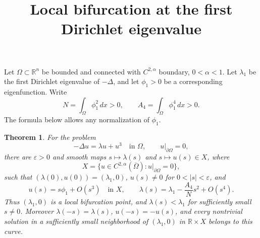 \documentclass[11pt]{article}
\title{Local bifurcation at the first Dirichlet eigenvalue}
\author{}
\date{}
\newtheorem{theorem}{Theorem}
\begin{document}
\maketitle

Let \(\Omega\subset\mathbb R^n\) be bounded and connected with
\(C^{2,\alpha}\) boundary, \(0<\alpha<1\). Let \(\lambda_1\) be the first
Dirichlet eigenvalue of \(-\Delta\), and let \(\phi_1>0\) be a corresponding
eigenfunction. Write
\[
 N=\int_\Omega\phi_1^2\,dx>0,\qquad
 A_4=\int_\Omega\phi_1^4\,dx>0.
\]
The formula below allows any normalization of \(\phi_1\).

\begin{theorem}
For the problem
\[
 -\Delta u=\lambda u+u^3\quad\text{in }\Omega,\qquad
 u|_{\partial\Omega}=0,
\]
there are \(\varepsilon>0\) and smooth maps
\(s\mapsto\lambda(s)\) and \(s\mapsto u(s)\in X\), where
\[
 X=\{u\in C^{2,\alpha}(\overline\Omega):u|_{\partial\Omega}=0\},
\]
such that \((\lambda(0),u(0))=(\lambda_1,0)\), \(u(s)\ne0\) for
\(0<|s|<\varepsilon\), and
\[
 u(s)=s\phi_1+O(s^3)\quad\text{in }X,\qquad
 \lambda(s)=\lambda_1-\frac{A_4}{N}s^2+O(s^4).
\]
Thus \((\lambda_1,0)\) is a local bifurcation point, and
\(\lambda(s)<\lambda_1\) for sufficiently small \(s\ne0\).
Moreover \(\lambda(-s)=\lambda(s)\), \(u(-s)=-u(s)\), and every
nontrivial solution in a sufficiently small neighborhood of
\((\lambda_1,0)\) in \(\mathbb R\times X\) belongs to this curve.
\end{theorem}
\end{document}
